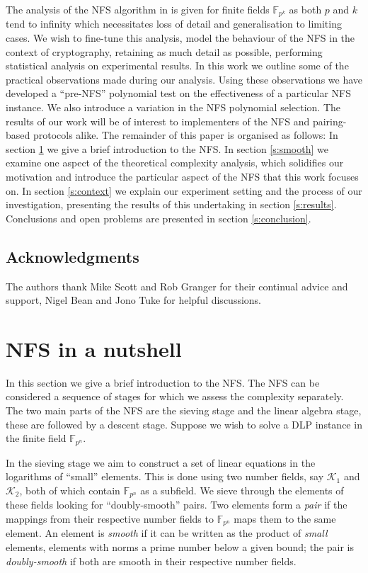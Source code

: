 \documentclass[a4paper, 12pt, envcountsect, runningheads]{llncs}
\newcommand{\F}{{\mathbb F}}
\numberwithin{figure}{section}
\numberwithin{equation}{section}
\begin{document}
The analysis of the NFS algorithm in \cite{joux-lercier-smart-vercauteren06} is given for finite fields $\F_{p^k}$ as both $p$ and $k$ tend to infinity which necessitates loss of detail and generalisation to limiting cases. We wish to fine-tune this analysis, model the behaviour of the NFS in the context of  cryptography, retaining as much detail as possible, performing statistical analysis on experimental results. In this work we outline some of the practical observations made during our analysis. Using these observations we have developed a ``pre-NFS'' polynomial test on the effectiveness of a particular NFS instance. We also introduce a variation in the NFS polynomial selection. The results of our work will be of interest to implementers of the NFS and pairing-based protocols alike. 
The remainder of this paper is organised as follows: In section \ref{s:nfs} we give a brief introduction to the NFS. In section \ref{s:smooth} we examine one aspect of the theoretical complexity analysis, which solidifies our motivation and introduce the particular aspect of the NFS that this work focuses on. In section \ref{s:context} we explain our experiment setting and the process of our investigation, presenting the results of this undertaking in section \ref{s:results}. Conclusions and open problems are presented in section \ref{s:conclusion}.
\subsection*{Acknowledgments}
The authors thank Mike Scott and Rob Granger for their continual advice and support, Nigel Bean and Jono Tuke for helpful discussions.

\section{NFS in a nutshell} 
\label{s:nfs}
In this section we give a brief introduction to the NFS. The NFS can be considered a sequence of stages for which we assess the complexity separately. The two main parts of the NFS are the sieving stage and the linear algebra stage, these are followed by a descent stage. Suppose we wish to solve a DLP instance in the finite field $\F_{p^n}.$

In the sieving stage we aim to construct a set of linear equations in the logarithms of ``small'' elements. This is done using two number fields, say $\mathcal{K}_{1}$ and $\mathcal{K}_{2}$, both of which contain $\F_{p^n}$ as a subfield. We sieve through the elements of these fields looking for ``doubly-smooth'' pairs. Two elements form a {\em pair} if the mappings from their respective number fields to $\F_{p^n}$ maps them to the same element. An element is {\em smooth} if it can be written as the product of {\em small} elements, elements with norms a prime number below a given bound; the pair is {\em doubly-smooth} if both are smooth in their respective number fields. 
\end{document}
